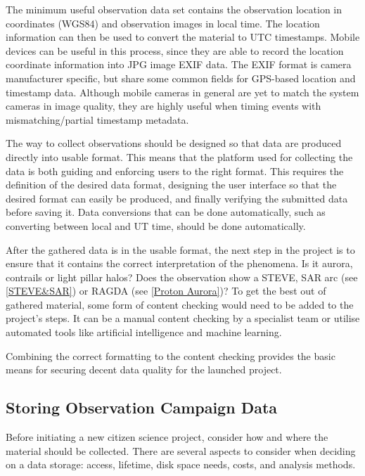 \documentclass{article}
\newcommand{\contributed}[1]{%
    \par\noindent
    \begingroup
    \setlength{\leftskip}{1em}%
    \itshape
    Contributors: #1
    \par
    \endgroup
    \vspace{0.5em}
}
\begin{document}
The minimum useful observation data set contains the observation location in coordinates (WGS84) and observation images in local time. The location information can then be used to convert the material to UTC timestamps. 
Mobile devices can be useful in this process, since they are able to record the location coordinate information into JPG image EXIF data. The EXIF format is camera manufacturer specific, but share some common fields for GPS-based location and timestamp data. Although mobile cameras in general are yet to match the system cameras in image quality, they are highly useful when timing events with mismatching/partial timestamp metadata.

The way to collect observations should be designed so that data are produced directly into usable format. This means that the platform used for collecting the data is both guiding and enforcing users to the right format. This requires the definition of the desired data format, designing the user interface so that the desired format can easily be produced, and finally verifying the submitted data before saving it. Data conversions that can be done automatically, such as converting between local and UT time, should be done automatically.

After the gathered data is in the usable format, the next step in the project is to ensure that it contains the correct interpretation of the phenomena. Is it aurora, contrails or light pillar halos? Does the observation show a STEVE, SAR arc (see \ref{STEVE&SAR}) or RAGDA (see \ref{Proton Aurora})? To get the best out of gathered material, some form of content checking would need to be added to the project's steps. It can be a manual content checking by a specialist team or utilise automated tools like artificial intelligence and machine learning.

Combining the correct formatting to the content checking provides the basic means for securing decent data quality for the launched project.

\subsection{Storing Observation Campaign Data}\label{sed:data_stoarge}
Before initiating a new citizen science project, consider how and where the material should be collected. There are several aspects to consider when deciding on a data storage: access, lifetime, disk space needs, costs, and analysis methods. 
\end{document}
